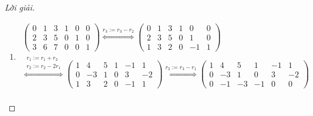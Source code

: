 \documentclass[class=linearalgebra,crop=false]{standalone}
\begin{document}
\begin{proof}[Lời giải]
    \begin{enumerate}[label = (\alph*)]
        \item
              \begingroup
              \allowdisplaybreaks
              \begin{gather*}
                  \left(
                  \begin{array}{ccc|ccc}
                          0 & 1 & 3 & 1 & 0 & 0 \\
                          2 & 3 & 5 & 0 & 1 & 0 \\
                          3 & 6 & 7 & 0 & 0 & 1
                      \end{array}
                  \right)
                  \stackrel{r_{3}:= r_{3} - r_{2}}{\Longleftrightarrow}
                  \left(
                  \begin{array}{ccc|ccc}
                          0 & 1 & 3 & 1 & 0  & 0 \\
                          2 & 3 & 5 & 0 & 1  & 0 \\
                          1 & 3 & 2 & 0 & -1 & 1
                      \end{array}
                  \right) \\
                  \stackrel{
                      \substack{
                          r_{1}:= r_{1} + r_{2} \\
                          r_{2} := r_{2} - 2r_{1}
                      }
                  }{\Longleftrightarrow}
                  \left(
                  \begin{array}{ccc|ccc}
                          1 & 4  & 5 & 1 & -1 & 1  \\
                          0 & -3 & 1 & 0 & 3  & -2 \\
                          1 & 3  & 2 & 0 & -1 & 1
                      \end{array}
                  \right)
                  \stackrel{
                      r_{3} := r_{3} - r_{1}
                  }{\Longleftrightarrow}
                  \left(
                  \begin{array}{ccc|ccc}
                          1 & 4  & 5  & 1  & -1 & 1  \\
                          0 & -3 & 1  & 0  & 3  & -2 \\
                          0 & -1 & -3 & -1 & 0  & 0
                      \end{array}
                  \right) \\

\end{gather*}
\end{enumerate}
\end{proof}
\end{document}
